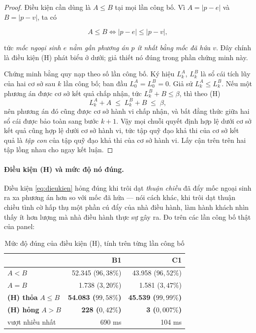 \begin{proof}
Điều kiện cần dùng là $A \le B$ tại mọi lần công bố. Vì $A = |p-e|$ và $B = |p-v|$, ta có

\begin{equation}
A \le B \iff |p - e| \le |p - v|,
\label{eq:dieukien}
\end{equation}

tức \emph{mốc ngoại sinh $e$ nằm gần phương án $p$ ít nhất bằng mốc đã hứa $v$}. Đây chính là
điều kiện (H) phát biểu ở dưới; giả thiết nó đúng trong phần chứng minh này.

Chứng minh bằng quy nạp theo số lần công bố. Ký hiệu $L^{A}_k$, $L^{B}_k$ là sổ cái tích lũy
của hai cơ sở sau $k$ lần công bố; ban đầu $L^{A}_0 = L^{B}_0 = 0$. Giả sử $L^{A}_k \le L^{B}_k$.
Nếu một phương án được cơ sở kết quả chấp nhận, tức $L^{B}_k + B \le \beta$, thì theo (H)
$$L^{A}_k + A \;\le\; L^{B}_k + B \;\le\; \beta,$$
nên phương án đó cũng được cơ sở hành vi chấp nhận, và bất đẳng thức giữa hai sổ cái được bảo
toàn sang bước $k+1$. Vậy mọi chuỗi quyết định hợp lệ dưới cơ sở kết quả cũng hợp lệ dưới cơ sở
hành vi, tức tập quỹ đạo khả thi của cơ sở kết quả là \emph{tập con} của tập quỹ đạo khả thi của
cơ sở hành vi. Lấy cận trên trên hai tập lồng nhau cho ngay kết luận.
\end{proof}

\paragraph{Điều kiện (H) và mức độ nó đúng.} Điều kiện \eqref{eq:dieukien} hỏng đúng khi trôi dạt
\emph{thuận chiều} đã đẩy mốc ngoại sinh ra xa phương án hơn so với mốc đã hứa --- nói cách khác,
khi trôi dạt thuận chiều tình cờ hấp thụ một phần cú đẩy của nhà điều hành, làm hành khách nhìn
thấy ít hơn lượng mà nhà điều hành thực sự gây ra. Đo trên các lần công bố thật của panel:

\begin{table}[htbp]
\centering
\caption{Mức độ đúng của điều kiện (H), tính trên từng lần công bố}
\label{bang:dieukien-h}
\small
\begin{tabular}{@{}lrr@{}}
\toprule
& \textbf{B1} & \textbf{C1}\\
\midrule
$A < B$ & 52.345 \;($96{,}38\%$) & 43.958 \;($96{,}52\%$)\\
$A = B$ & 1.738 \;($3{,}20\%$) & 1.581 \;($3{,}47\%$)\\
\midrule
\textbf{(H) thỏa} $A \le B$ & \textbf{54.083 \;($99{,}58\%$)} & \textbf{45.539 \;($99{,}99\%$)}\\
\textbf{(H) hỏng} $A > B$ & \textbf{228 \;($0{,}42\%$)} & \textbf{3 \;($0{,}007\%$)}\\
\quad vượt nhiều nhất & 690 ms & 104 ms\\
\bottomrule
\end{tabular}
\end{table}

